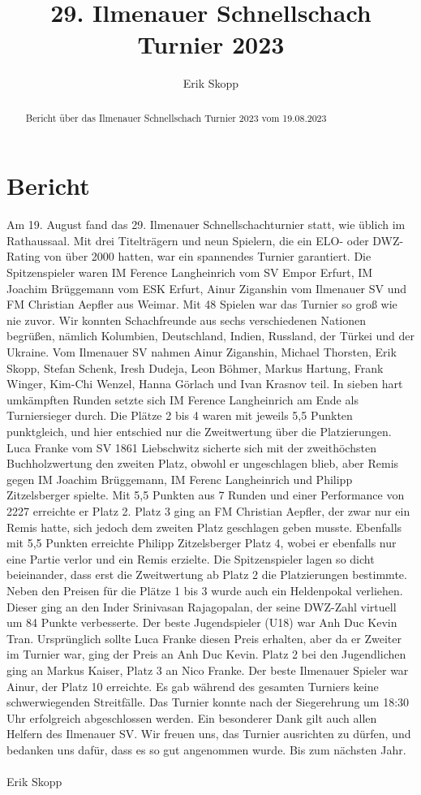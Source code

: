 \documentclass[a4paper,ngerman]{tui-algo-seminar}
\title{29. Ilmenauer Schnellschach Turnier 2023}
\author{Erik Skopp}
\begin{document}
\maketitle

\begin{abstract}
Bericht über das Ilmenauer Schnellschach Turnier 2023 vom 19.08.2023
\end{abstract}

\section{Bericht}
Am 19. August fand das 29. Ilmenauer Schnellschachturnier statt, wie üblich im Rathaussaal. Mit drei Titelträgern und neun Spielern, die ein ELO- oder DWZ-Rating von über 2000 hatten, war ein spannendes Turnier garantiert. Die Spitzenspieler waren IM Ference Langheinrich vom SV Empor Erfurt, IM Joachim Brüggemann vom ESK Erfurt, Ainur Ziganshin vom Ilmenauer SV und FM Christian Aepfler aus Weimar. Mit 48 Spielen war das Turnier so groß wie nie zuvor. Wir konnten Schachfreunde aus sechs verschiedenen Nationen begrüßen, nämlich Kolumbien, Deutschland, Indien, Russland, der Türkei und der Ukraine. Vom Ilmenauer SV nahmen Ainur Ziganshin, Michael Thorsten, Erik Skopp, Stefan Schenk, Iresh Dudeja, Leon Böhmer, Markus Hartung, Frank Winger, Kim-Chi Wenzel, Hanna Görlach und Ivan Krasnov teil. In sieben hart umkämpften Runden setzte sich IM Ference Langheinrich am Ende als Turniersieger durch. Die Plätze 2 bis 4 waren mit jeweils 5,5 Punkten punktgleich, und hier entschied nur die Zweitwertung über die Platzierungen. Luca Franke vom SV 1861 Liebschwitz sicherte sich mit der zweithöchsten Buchholzwertung den zweiten Platz, obwohl er ungeschlagen blieb, aber Remis gegen IM Joachim Brüggemann, IM Ferenc Langheinrich und Philipp Zitzelsberger spielte. Mit 5,5 Punkten aus 7 Runden und einer Performance von 2227 erreichte er Platz 2. Platz 3 ging an FM Christian Aepfler, der zwar nur ein Remis hatte, sich jedoch dem zweiten Platz geschlagen geben musste. Ebenfalls mit 5,5 Punkten erreichte Philipp Zitzelsberger Platz 4, wobei er ebenfalls nur eine Partie verlor und ein Remis erzielte. Die Spitzenspieler lagen so dicht beieinander, dass erst die Zweitwertung ab Platz 2 die Platzierungen bestimmte. Neben den Preisen für die Plätze 1 bis 3 wurde auch ein Heldenpokal verliehen. Dieser ging an den Inder Srinivasan Rajagopalan, der seine DWZ-Zahl virtuell um 84 Punkte verbesserte. Der beste Jugendspieler (U18) war Anh Duc Kevin Tran. Ursprünglich sollte Luca Franke diesen Preis erhalten, aber da er Zweiter im Turnier war, ging der Preis an Anh Duc Kevin. Platz 2 bei den Jugendlichen ging an Markus Kaiser, Platz 3 an Nico Franke. Der beste Ilmenauer Spieler war Ainur, der Platz 10 erreichte. Es gab während des gesamten Turniers keine schwerwiegenden Streitfälle. Das Turnier konnte nach der Siegerehrung um 18:30 Uhr erfolgreich abgeschlossen werden. Ein besonderer Dank gilt auch allen Helfern des Ilmenauer SV. Wir freuen uns, das Turnier ausrichten zu dürfen, und bedanken uns dafür, dass es so gut angenommen wurde. Bis zum nächsten Jahr.\\
\\ 
Erik Skopp
\end{document}
